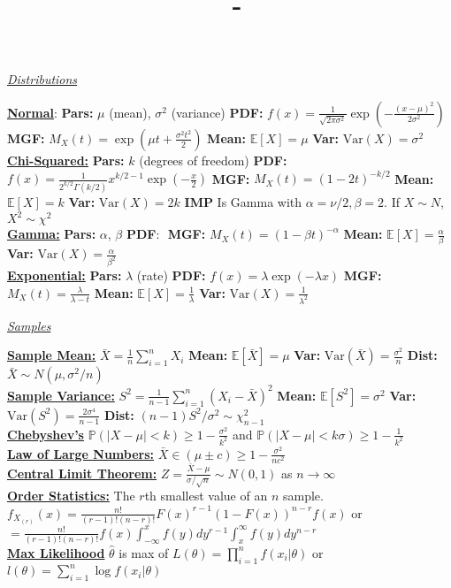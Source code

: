 \documentclass[answers,12pt,addpoints]{exam}
\author{\name}
\title{\course \ - \assignment}
\begin{document}
\begin{center}
    \textit{\underline{Distributions}}\\
\end{center}
\textbf{\underline{Normal}}: \textbf{Pars:} $\mu$ (mean), $\sigma^2$ (variance) \textbf{PDF:} $f(x) = \frac{1}{\sqrt{2\pi\sigma^2}}\exp\left(-\frac{(x-\mu)^2}{2\sigma^2}\right)$ \textbf{MGF:} $M_X(t) = \exp\left(\mu t + \frac{\sigma^2 t^2}{2}\right)$ \textbf{Mean:} $\mathbb{E}[X] = \mu$ \textbf{Var:} $\text{Var}(X) = \sigma^2$\\
\textbf{\underline{Chi-Squared:}} \textbf{Pars:} $k$ (degrees of freedom) \textbf{PDF:} 
$f(x) = \frac{1}{2^{k/2}\Gamma(k/2)}x^{k/2-1}\exp\left(-\frac{x}{2}\right)$ \textbf{MGF:} $M_X(t) = (1-2t)^{-k/2}$ \textbf{Mean:} $\mathbb{E}[X] = k$ \textbf{Var:} $\text{Var}(X) = 2k$ \textbf{IMP} Is Gamma with $\alpha = \nu/2, \beta = 2$. If $X\sim N$, $X^2 \sim \chi^2$  \\
\textbf{\underline{Gamma:}} \textbf{Pars:} $\alpha$, $\beta$ \textbf{PDF}: $ $
\textbf{MGF:} $M_X(t) = (1-\beta t)^{-\alpha}$ \textbf{Mean:} $\mathbb{E}[X] = \frac{\alpha}{\beta}$ \textbf{Var:} $\text{Var}(X) = \frac{\alpha}{\beta^2}$\\
\textbf{\underline{Exponential:}} \textbf{Pars:} $\lambda$ (rate) \textbf{PDF:} $f(x) = \lambda\exp(-\lambda x)$ \textbf{MGF:} $M_X(t) = \frac{\lambda}{\lambda - t}$ \textbf{Mean:} $\mathbb{E}[X] = \frac{1}{\lambda}$ \textbf{Var:} $\text{Var}(X) = \frac{1}{\lambda^2}$
\begin{center}
    \textit{\underline{Samples}}\\
\end{center}
\textbf{\underline{Sample Mean:}} $\bar{X} = \frac{1}{n}\sum_{i=1}^n X_i$ \textbf{Mean:} $\mathbb{E}[\bar{X}] = \mu$ \textbf{Var:} $\text{Var}(\bar{X}) = \frac{\sigma^2}{n}$ \textbf{Dist:} $\bar{X}\sim N(\mu, \sigma^2/n)$\\
\textbf{\underline{Sample Variance:}} $S^2 = \frac{1}{n-1}\sum_{i=1}^n (X_i - \bar{X})^2$ \textbf{Mean:} $\mathbb{E}[S^2] = \sigma^2$ \textbf{Var:} $\text{Var}(S^2) = \frac{2\sigma^4}{n-1}$ \textbf{Dist:} $(n-1)S^2/\sigma^2 \sim \chi^2_{n-1}$\\
\textbf{\underline{Chebyshev's} } $\mathbb{P}(|X-\mu|< k) \geq 1 - \frac{\sigma^2}{k^2}$ and $\mathbb{P}(|X-\mu|< k\sigma) \geq 1 - \frac{1}{k^2}$ \\
\textbf{\underline{Law of Large Numbers:}} $\bar{X} \in (\mu \pm c) \geq 1-\frac{\sigma^2}{nc^2}$   \\
\textbf{\underline{Central Limit Theorem:}} $Z= \frac{\bar{X} - \mu}{\sigma / \sqrt{n}} \sim N(0,1)$ as $n \to \infty$\\
\textbf{\underline{Order Statistics:}} The $r$th smallest value of an $n$ sample. $f_{X_{(r)}}(x) = \frac{n!}{(r-1)!(n-r)!}F(x)^{r-1}(1-F(x))^{n-r}f(x)$ or $= \frac{n!}{(r-1)!(n-r)!}f(x)\int_{-\infty}^x f(y)dy^{r-1}\int_x^\infty f(y)dy^{n-r}$\\
\textbf{\underline{Max Likelihood}} $\hat{\theta}$ is max of $L(\theta) = \prod_{i=1}^n f(x_i|\theta)$ or $l(\theta) = \sum_{i=1}^n \log f(x_i|\theta)$\\
\end{document}
